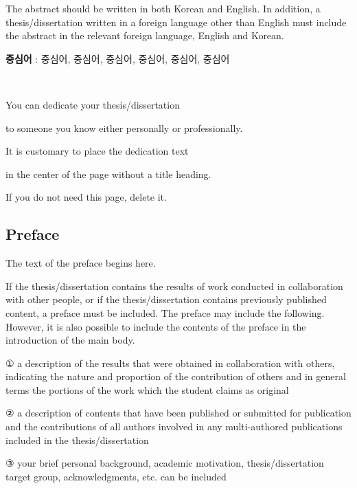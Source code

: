 \documentclass[11pt]{report}
\numberwithin{figure}{section}
\theoremstyle{plain}
\theoremstyle{definition}
\theoremstyle{corollary}
\theoremstyle{definition}
\theoremstyle{plain}
\theoremstyle{definition}
\theoremstyle{plain}
\begin{document}
The abstract should be written in both Korean and English.
In addition, a thesis/dissertation written in a foreign language other than English must include the abstract in the relevant foreign language, English and Korean. 

\par\vspace{100pt}

\textbf{중심어} : 중심어, 중심어, 중심어, 중심어, 중심어, 중심어

\newpage
~
\vspace{5.5cm} \par
\begin{center}
You can dedicate your thesis/dissertation  \par 
to someone you know either personally or professionally. \par
It is customary to place the dedication text \par
in the center of the page without a title heading. \par
If you do not need this page, delete it.
\end{center}

\newpage
\begin{center}
\section*{Preface}
\end{center}

\normalsize
The text of the preface begins here. 

If the thesis/dissertation contains the results of work conducted in collaboration with other people, or if the thesis/dissertation contains previously published content, a preface must be included. The preface may include the following. However, it is also possible to include the contents of the preface in the introduction of the main body.\par

① a description of the results that were obtained in collaboration with others, indicating the nature and proportion of the contribution of others and in general terms the portions of the work which the student claims as original \par
② a description of contents that have been published or submitted for publication and the contributions of all authors involved in any multi-authored publications included in the thesis/dissertation \par
③ your brief personal background, academic motivation, thesis/dissertation target group, acknowledgments, etc. can be included 
\end{document}
